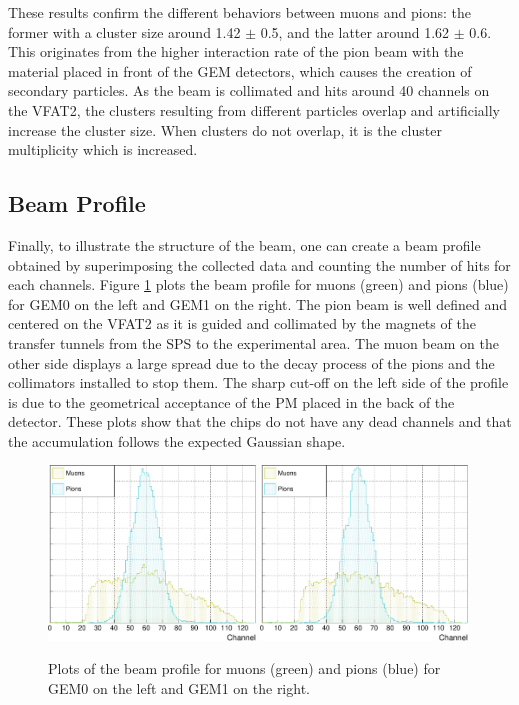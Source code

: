       These results confirm the different behaviors between muons and pions: the former with a cluster size around 1.42 $\pm$ 0.5, and the latter around 1.62 $\pm$ 0.6. This originates from the higher interaction rate of the pion beam with the material placed in front of the GEM detectors, which causes the creation of secondary particles. As the beam is collimated and hits around 40 channels on the VFAT2, the clusters resulting from different particles overlap and artificially increase the cluster size. When clusters do not overlap, it is the cluster multiplicity which is increased.

    \subsection{Beam Profile}

      Finally, to illustrate the structure of the beam, one can create a beam profile obtained by superimposing the collected data and counting the number of hits for each channels. Figure \ref{fig:II-3-data-beam-profile} plots the beam profile for muons (green) and pions (blue) for GEM0 on the left and GEM1 on the right. The pion beam is well defined and centered on the VFAT2 as it is guided and collimated by the magnets of the transfer tunnels from the SPS to the experimental area. The muon beam on the other side displays a large spread due to the decay process of the pions and the collimators installed to stop them. The sharp cut-off on the left side of the profile is due to the geometrical acceptance of the PM placed in the back of the detector. These plots show that the chips do not have any dead channels and that the accumulation follows the expected Gaussian shape.

      \begin{figure}[h!]
        \centering
        \includegraphics[width=0.49\textwidth]{img/plots/cBeamProfile_GEM0-crop}
        \includegraphics[width=0.49\textwidth]{img/plots/cBeamProfile_GEM1-crop}
        \caption{Plots of the beam profile for muons (green) and pions (blue) for GEM0 on the left and GEM1 on the right.}
        \label{fig:II-3-data-beam-profile}
      \end{figure}

